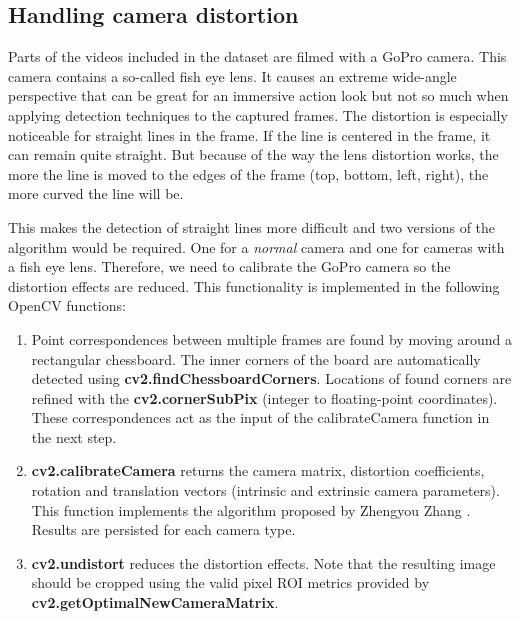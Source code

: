 \subsection{Handling camera distortion}

Parts of the videos included in the dataset are filmed with a GoPro camera. This camera contains a so-called fish eye lens. It causes an extreme wide-angle perspective that can be great for an immersive action look but not so much when applying detection techniques to the captured frames. The distortion is especially noticeable for straight lines in the frame. If the line is centered in the frame, it can remain quite straight. But because of the way the lens distortion works, the more the line is moved to the edges of the frame (top, bottom, left, right), the more curved the line will be.

This makes the detection of straight lines more difficult and two versions of the algorithm would be required. One for a \textit{normal} camera and one for cameras with a fish eye lens. Therefore, we need to calibrate the GoPro camera so the distortion effects are reduced. This functionality is implemented in the following OpenCV functions: 

\begin{enumerate}
    \item Point correspondences between multiple frames are found by moving around a rectangular chessboard. The inner corners of the board are automatically detected using \textbf{cv2.findChessboardCorners}. Locations of found corners are refined with the \textbf{cv2.cornerSubPix} (integer to floating-point coordinates). These correspondences act as the input of the calibrateCamera function in the next step.
    \item \textbf{cv2.calibrateCamera} returns the camera matrix, distortion coefficients, rotation and translation vectors (intrinsic and extrinsic camera parameters). This function implements the algorithm proposed by Zhengyou Zhang \cite{Zhang2000}. Results are persisted for each camera type.
    \item \textbf{cv2.undistort} reduces the distortion effects. Note that the resulting image should be cropped using the valid pixel ROI metrics provided by \textbf{cv2.getOptimalNewCameraMatrix}.
\end{enumerate}


